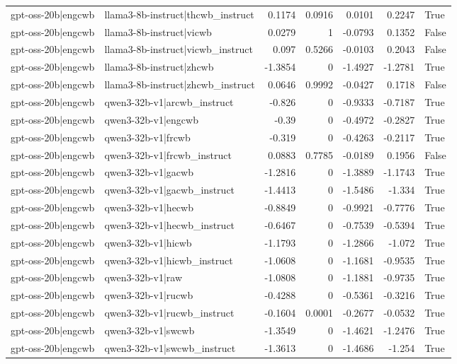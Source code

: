 \begin{table}
\begin{tabular}{l l r r r r l}
gpt-oss-20b|engcwb & llama3-8b-instruct|thcwb_instruct & 0.1174 & 0.0916 & 0.0101 & 0.2247 & True \\
gpt-oss-20b|engcwb & llama3-8b-instruct|vicwb & 0.0279 & 1 & -0.0793 & 0.1352 & False \\
gpt-oss-20b|engcwb & llama3-8b-instruct|vicwb_instruct & 0.097 & 0.5266 & -0.0103 & 0.2043 & False \\
gpt-oss-20b|engcwb & llama3-8b-instruct|zhcwb & -1.3854 & 0 & -1.4927 & -1.2781 & True \\
gpt-oss-20b|engcwb & llama3-8b-instruct|zhcwb_instruct & 0.0646 & 0.9992 & -0.0427 & 0.1718 & False \\
gpt-oss-20b|engcwb & qwen3-32b-v1|arcwb_instruct & -0.826 & 0 & -0.9333 & -0.7187 & True \\
gpt-oss-20b|engcwb & qwen3-32b-v1|engcwb & -0.39 & 0 & -0.4972 & -0.2827 & True \\
gpt-oss-20b|engcwb & qwen3-32b-v1|frcwb & -0.319 & 0 & -0.4263 & -0.2117 & True \\
gpt-oss-20b|engcwb & qwen3-32b-v1|frcwb_instruct & 0.0883 & 0.7785 & -0.0189 & 0.1956 & False \\
gpt-oss-20b|engcwb & qwen3-32b-v1|gacwb & -1.2816 & 0 & -1.3889 & -1.1743 & True \\
gpt-oss-20b|engcwb & qwen3-32b-v1|gacwb_instruct & -1.4413 & 0 & -1.5486 & -1.334 & True \\
gpt-oss-20b|engcwb & qwen3-32b-v1|hecwb & -0.8849 & 0 & -0.9921 & -0.7776 & True \\
gpt-oss-20b|engcwb & qwen3-32b-v1|hecwb_instruct & -0.6467 & 0 & -0.7539 & -0.5394 & True \\
gpt-oss-20b|engcwb & qwen3-32b-v1|hicwb & -1.1793 & 0 & -1.2866 & -1.072 & True \\
gpt-oss-20b|engcwb & qwen3-32b-v1|hicwb_instruct & -1.0608 & 0 & -1.1681 & -0.9535 & True \\
gpt-oss-20b|engcwb & qwen3-32b-v1|raw & -1.0808 & 0 & -1.1881 & -0.9735 & True \\
gpt-oss-20b|engcwb & qwen3-32b-v1|rucwb & -0.4288 & 0 & -0.5361 & -0.3216 & True \\
gpt-oss-20b|engcwb & qwen3-32b-v1|rucwb_instruct & -0.1604 & 0.0001 & -0.2677 & -0.0532 & True \\
gpt-oss-20b|engcwb & qwen3-32b-v1|swcwb & -1.3549 & 0 & -1.4621 & -1.2476 & True \\
gpt-oss-20b|engcwb & qwen3-32b-v1|swcwb_instruct & -1.3613 & 0 & -1.4686 & -1.254 & True \\

\end{tabular}
\end{table}
